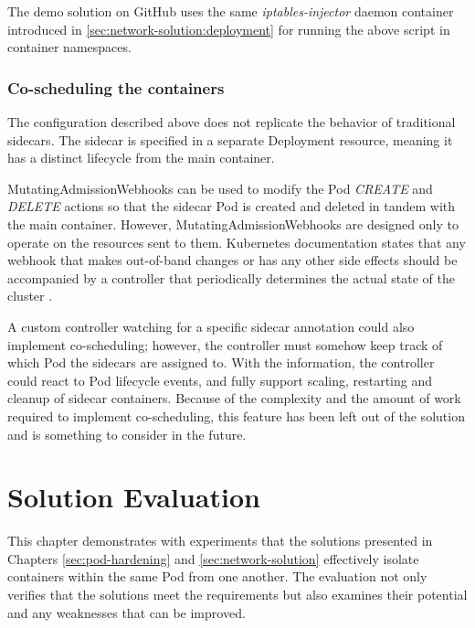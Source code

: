 \documentclass[english, 12pt, a4paper, sci, utf8, a-2b, online]{aaltothesis}
\begin{document}


The demo solution on GitHub uses the same \emph{iptables-injector} daemon container introduced in \ref{sec:network-solution:deployment} for running the above script in container namespaces.

\subsubsection{Co-scheduling the containers}

The configuration described above does not replicate the behavior of traditional sidecars.
The sidecar is specified in a separate Deployment resource, meaning it has a distinct lifecycle from the main container.

MutatingAdmissionWebhooks can be used to modify the Pod \emph{CREATE} and \emph{DELETE} actions so that the sidecar Pod is created and deleted in tandem with the main container.
However, MutatingAdmissionWebhooks are designed only to operate on the resources sent to them.
Kubernetes documentation states that any webhook that makes out-of-band changes or has any other side effects should be accompanied by a controller that periodically determines the actual state of the cluster \cite{k8s-docs-dac}.

A custom controller watching for a specific sidecar annotation could also implement co-scheduling; however, the controller must somehow keep track of which Pod the sidecars are assigned to.
With the information, the controller could react to Pod lifecycle events, and fully support scaling, restarting and cleanup of sidecar containers.
Because of the complexity and the amount of work required to implement co-scheduling, this feature has been left out of the solution and is something to consider in the future.

\clearpage

\section{Solution Evaluation} \label{sec:solution}

This chapter demonstrates with experiments that the solutions presented in Chapters \ref{sec:pod-hardening} and \ref{sec:network-solution} effectively isolate containers within the same Pod from one another.
The evaluation not only verifies that the solutions meet the requirements but also examines their potential and any weaknesses that can be improved.
\end{document}
